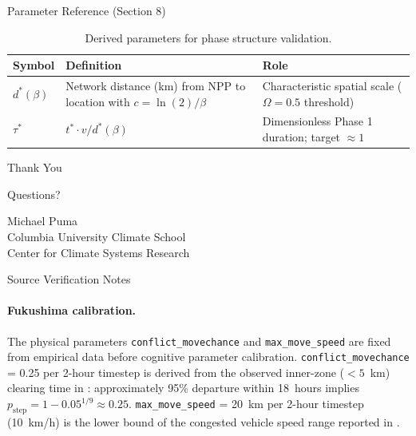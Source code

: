 \documentclass[aspectratio=169]{beamer}
\begin{document}
\begin{frame}{Parameter Reference (Section 8)}

\begin{table}[h]
\small
\begin{tabular}{lll}
\toprule
Symbol & Definition & Role \\
\midrule
$d^*(\beta)$ & Network distance (km) from NPP to location with $c = \ln(2)/\beta$ & Characteristic spatial scale ($\Omega = 0.5$ threshold) \\
$\tau^*$ & $t^* \cdot v / d^*(\beta)$ & Dimensionless Phase 1 duration; target $\approx 1$ \\
\bottomrule
\end{tabular}
\caption{Derived parameters for phase structure validation.}
\end{table}

\end{frame}

\begin{frame}
\begin{center}
\Huge Thank You

\vspace{1em}

\Large Questions?

\vspace{1.5em}

\normalsize
Michael Puma\\
Columbia University Climate School\\
Center for Climate Systems Research
\end{center}
\end{frame}

\begin{frame}{Source Verification Notes}

\paragraph{Fukushima calibration.} The physical parameters
\texttt{conflict\_movechance} and \texttt{max\_move\_speed} are fixed from
empirical data before cognitive parameter calibration.
\texttt{conflict\_movechance} = 0.25 per 2-hour timestep is derived from the
observed inner-zone ($<5$~km) clearing time in \citet{Hayano2013}:
approximately 95\% departure within 18~hours implies
$p_{\text{step}} = 1 - 0.05^{1/9} \approx 0.25$.
\texttt{max\_move\_speed} = 20~km per 2-hour timestep (10~km/h) is the
lower bound of the congested vehicle speed range reported in
\citet{Shimazaki2012}.

\end{frame}
\end{document}
